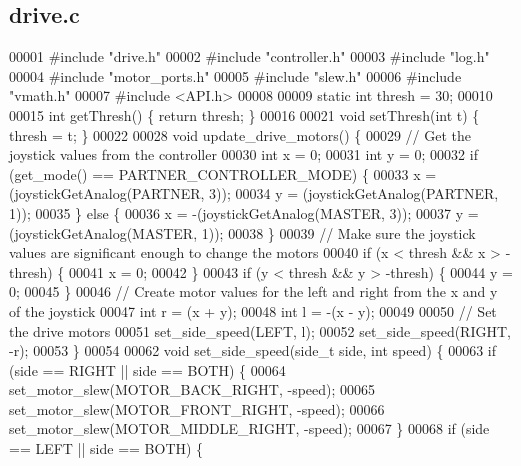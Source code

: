 \subsection{drive.\+c}
\label{drive_8c_source}

\begin{DoxyCode}
00001 \textcolor{preprocessor}{#include "drive.h"}
00002 \textcolor{preprocessor}{#include "controller.h"}
00003 \textcolor{preprocessor}{#include "log.h"}
00004 \textcolor{preprocessor}{#include "motor_ports.h"}
00005 \textcolor{preprocessor}{#include "slew.h"}
00006 \textcolor{preprocessor}{#include "vmath.h"}
00007 \textcolor{preprocessor}{#include <API.h>}
00008 
00009 \textcolor{keyword}{static} \textcolor{keywordtype}{int} thresh = 30;
00010 
00015 \textcolor{keywordtype}{int} getThresh() \{ \textcolor{keywordflow}{return} thresh; \}
00016 
00021 \textcolor{keywordtype}{void} setThresh(\textcolor{keywordtype}{int} t) \{ thresh = t; \}
00022 
00028 \textcolor{keywordtype}{void} update_drive_motors() \{
00029   \textcolor{comment}{// Get the joystick values from the controller}
00030   \textcolor{keywordtype}{int} x = 0;
00031   \textcolor{keywordtype}{int} y = 0;
00032   \textcolor{keywordflow}{if} (get_mode() == PARTNER_CONTROLLER_MODE) \{
00033     x = (joystickGetAnalog(PARTNER, 3));
00034     y = (joystickGetAnalog(PARTNER, 1));
00035   \} \textcolor{keywordflow}{else} \{
00036     x = -(joystickGetAnalog(MASTER, 3));
00037     y = (joystickGetAnalog(MASTER, 1));
00038   \}
00039   \textcolor{comment}{// Make sure the joystick values are significant enough to change the motors}
00040   \textcolor{keywordflow}{if} (x < thresh && x > -thresh) \{
00041     x = 0;
00042   \}
00043   \textcolor{keywordflow}{if} (y < thresh && y > -thresh) \{
00044     y = 0;
00045   \}
00046   \textcolor{comment}{// Create motor values for the left and right from the x and y of the joystick}
00047   \textcolor{keywordtype}{int} r = (x + y);
00048   \textcolor{keywordtype}{int} l = -(x - y);
00049 
00050   \textcolor{comment}{// Set the drive motors}
00051   set_side_speed(LEFT, l);
00052   set_side_speed(RIGHT, -r);
00053 \}
00054 
00062 \textcolor{keywordtype}{void} set_side_speed(side_t side, \textcolor{keywordtype}{int} speed) \{
00063   \textcolor{keywordflow}{if} (side == RIGHT || side == BOTH) \{
00064     set_motor_slew(MOTOR_BACK_RIGHT, -speed);
00065     set_motor_slew(MOTOR_FRONT_RIGHT, -speed);
00066     set_motor_slew(MOTOR_MIDDLE_RIGHT, -speed);
00067   \}
00068   \textcolor{keywordflow}{if} (side == LEFT || side == BOTH) \{

\end{DoxyCode}

